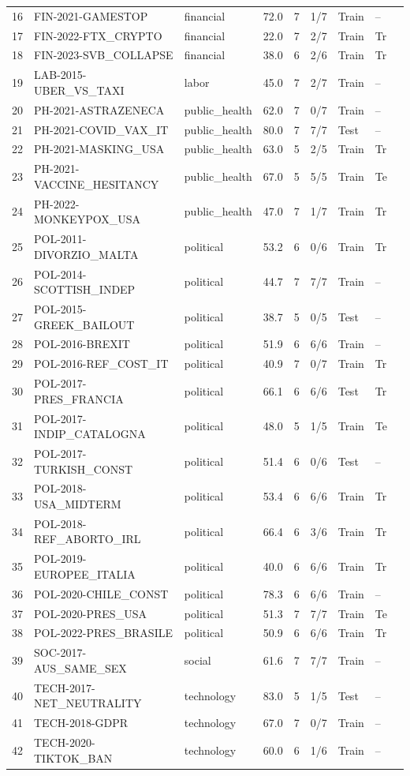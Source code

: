 \documentclass[12pt]{article}
\begin{document}
\begin{longtable}{@{}r >{\raggedright\arraybackslash}p{3.5cm} l r r r l l l@{}}
16 & FIN-2021-GAMESTOP & financial & 72.0 & 7 & 1/7 & Train & -- & \\
17 & FIN-2022-FTX\_CRYPTO & financial & 22.0 & 7 & 2/7 & Train & Tr & \\
18 & FIN-2023-SVB\_COLLAPSE & financial & 38.0 & 6 & 2/6 & Train & Tr & \\
19 & LAB-2015-UBER\_VS\_TAXI & labor & 45.0 & 7 & 2/7 & Train & -- & \\
20 & PH-2021-ASTRAZENECA & public\_health & 62.0 & 7 & 0/7 & Train & -- & \\
21 & PH-2021-COVID\_VAX\_IT & public\_health & 80.0 & 7 & 7/7 & Test & -- & \\
22 & PH-2021-MASKING\_USA & public\_health & 63.0 & 5 & 2/5 & Train & Tr & \\
23 & PH-2021-VACCINE\_HESITANCY & public\_health & 67.0 & 5 & 5/5 & Train & Te & \\
24 & PH-2022-MONKEYPOX\_USA & public\_health & 47.0 & 7 & 1/7 & Train & Tr & \\
25 & POL-2011-DIVORZIO\_MALTA & political & 53.2 & 6 & 0/6 & Train & Tr & \\
26 & POL-2014-SCOTTISH\_INDEP & political & 44.7 & 7 & 7/7 & Train & -- & \\
27 & POL-2015-GREEK\_BAILOUT & political & 38.7 & 5 & 0/5 & Test & -- & \\
28 & POL-2016-BREXIT & political & 51.9 & 6 & 6/6 & Train & -- & \\
29 & POL-2016-REF\_COST\_IT & political & 40.9 & 7 & 0/7 & Train & Tr & \\
30 & POL-2017-PRES\_FRANCIA & political & 66.1 & 6 & 6/6 & Test & Tr & \\
31 & POL-2017-INDIP\_CATALOGNA & political & 48.0 & 5 & 1/5 & Train & Te & \\
32 & POL-2017-TURKISH\_CONST & political & 51.4 & 6 & 0/6 & Test & -- & \\
33 & POL-2018-USA\_MIDTERM & political & 53.4 & 6 & 6/6 & Train & Tr & \\
34 & POL-2018-REF\_ABORTO\_IRL & political & 66.4 & 6 & 3/6 & Train & Tr & \\
35 & POL-2019-EUROPEE\_ITALIA & political & 40.0 & 6 & 6/6 & Train & Tr & \\
36 & POL-2020-CHILE\_CONST & political & 78.3 & 6 & 6/6 & Train & -- & \\
37 & POL-2020-PRES\_USA & political & 51.3 & 7 & 7/7 & Train & Te & \\
38 & POL-2022-PRES\_BRASILE & political & 50.9 & 6 & 6/6 & Train & Tr & \\
39 & SOC-2017-AUS\_SAME\_SEX & social & 61.6 & 7 & 7/7 & Train & -- & \\
40 & TECH-2017-NET\_NEUTRALITY & technology & 83.0 & 5 & 1/5 & Test & -- & \\
41 & TECH-2018-GDPR & technology & 67.0 & 7 & 0/7 & Train & -- & \\
42 & TECH-2020-TIKTOK\_BAN & technology & 60.0 & 6 & 1/6 & Train & -- & \\
\end{longtable}
\end{document}
